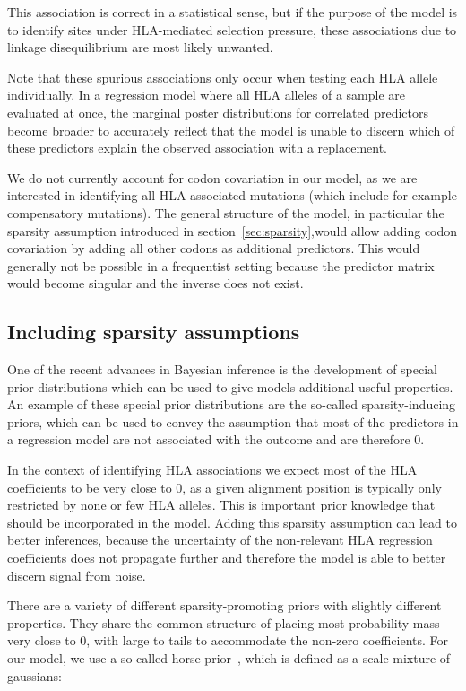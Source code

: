 \documentclass[fleqn,11pt]{SelfArx} %
\begin{document}
This association is correct in a statistical sense, but if the purpose of the model is to identify sites under HLA-mediated selection pressure, these associations due to linkage disequilibrium are most likely unwanted.

Note that these spurious associations only occur when testing each HLA allele individually. In a regression model where all HLA alleles of a sample are evaluated at once, the marginal poster distributions for correlated predictors become broader to accurately reflect that the model is unable to discern which of these predictors explain the observed association with a replacement.

We do not currently account for codon covariation in our model, as we are interested in identifying all HLA associated mutations (which include for example compensatory mutations). The general structure of the model, in particular the sparsity assumption introduced in section~\ref{sec:sparsity},would allow adding codon covariation by adding all other codons as additional predictors. This would generally not be possible in a frequentist setting because the predictor matrix would become singular and the inverse does not exist. 

\subsection*{Including sparsity assumptions} \label{sec:sparsity}

One of the recent advances in Bayesian inference is the development of special prior distributions which can be used to give models additional useful properties. An example of these special prior distributions are the so-called sparsity-inducing priors, which can be used to convey the assumption that most of the predictors in a regression model are not associated with the outcome and are therefore 0.

In the context of identifying HLA associations we expect most of the HLA coefficients to be very close to 0, as a given alignment position is typically only restricted by none or few HLA alleles.
This is important prior knowledge that should be incorporated in the model.
Adding this sparsity assumption can lead to better inferences, because the uncertainty of the non-relevant HLA regression coefficients does not propagate further and therefore the model is able to better discern signal from noise.

There are a variety of different sparsity-promoting priors with slightly different properties. They share the common structure of placing most probability mass very close to 0, with large to tails to accommodate the non-zero coefficients.
For our model, we use a so-called horse prior~\cite{Carvalho2010}, which is defined as a scale-mixture of gaussians:
\end{document}
